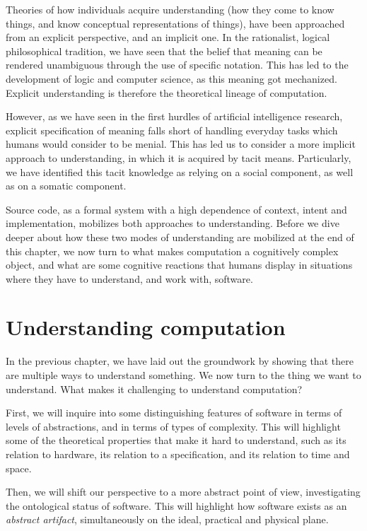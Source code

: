 Theories of how individuals acquire understanding (how they come to know things, and know conceptual representations of things), have been approached from an explicit perspective, and an implicit one. In the rationalist, logical philosophical tradition, we have seen that the belief that meaning can be rendered unambiguous through the use of specific notation. This has led to the development of logic and computer science, as this meaning got mechanized. Explicit understanding is therefore the theoretical lineage of computation.

However, as we have seen in the first hurdles of artificial intelligence research, explicit specification of meaning falls short of handling everyday tasks which humans would consider to be menial. This has led us to consider a more implicit approach to understanding, in which it is acquired by tacit means. Particularly, we have identified this tacit knowledge as relying on a social component, as well as on a somatic component.

Source code, as a formal system with a high dependence of context, intent and implementation, mobilizes both approaches to understanding. Before we dive deeper about how these two modes of understanding are mobilized at the end of this chapter, we now turn to what makes computation a cognitively complex object, and what are some cognitive reactions that humans display in situations where they have to understand, and work with, software.

\clearpage

\section{Understanding computation}
\label{sec:understanding-computation}

In the previous chapter, we have laid out the groundwork by showing that there are multiple ways to understand something. We now turn to the thing we want to understand. What makes it challenging to understand computation?

First, we will inquire into some distinguishing features of software in terms of levels of abstractions, and in terms of types of complexity. This will highlight some of the theoretical properties that make it hard to understand, such as its relation to hardware, its relation to a specification, and its relation to time and space.

Then, we will shift our perspective to a more abstract point of view, investigating the ontological status of software. This will highlight how software exists as an \emph{abstract artifact}, simultaneously on the ideal, practical and physical plane.

